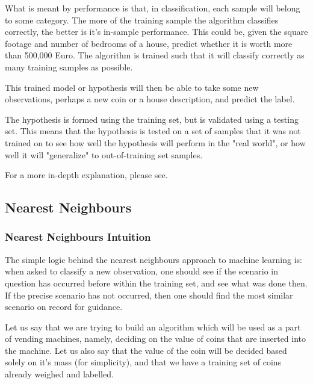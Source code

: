 \documentclass[a4paper, 12pt]{article}
\begin{document}
            \par What is meant by performance is that, in classification, each sample will belong to some category. The more of the training sample the algorithm classifies correctly, the better is it's in-sample performance. This could be, given the square footage and number of bedrooms of a house, predict whether it is worth more than 500,000 Euro. The algorithm is trained such that it will classify correctly as many training samples as possible.
            
            \par This trained model or hypothesis will then be able to take some new observations, perhaps a new coin or a house description, and predict the label.
            
            \par The hypothesis is formed using the training set, but is validated using a testing set. This means that the hypothesis is tested on a set of samples that it was not trained on to see how well the hypothesis will perform in the "real world", or how well it will "generalize" to out-of-training set samples.
            
            \par For a more in-depth explanation, please see\cite{machineLearningBackground}.

        \subsection{Nearest Neighbours}

            \subsubsection{Nearest Neighbours Intuition}

                \par The simple logic behind the nearest neighbours approach to machine learning is: when asked to classify a new observation, one should see if the scenario in question has occurred before within the training set, and see what was done then. If the precise scenario has not occurred, then one should find the most similar scenario on record for guidance.

                \par Let us say that we are trying to build an algorithm which will be used as a part of vending machines, namely, deciding on the value of coins that are inserted into the machine. Let us also say that the value of the coin will be decided based solely on it's mass (for simplicity), and that we have a training set of coins already weighed and labelled.
\end{document}
